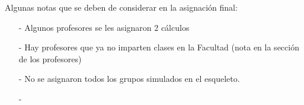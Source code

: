 Algunas notas que se deben de considerar en la asignación final:

\begin{itemize}
\item[-] Algunos profesores se les asignaron 2 cálculos

\item[-] Hay profesores que ya no imparten clases en la Facultad (nota en la sección de los profesores)

\item[-] No se asignaron todos los grupos simulados en el esqueleto.

\item[-] 
\end{itemize}
